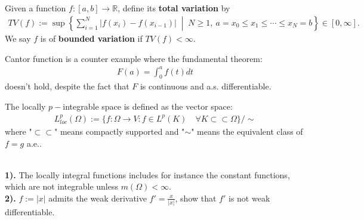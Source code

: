 \begin{definition}
    Given a function $f : [a, b] \to \mathbb{R}$, define its \textbf{total variation} by
    \begin{align*}
        TV(f) := \sup\left\{ \sum_{i=1}^N |f(x_i) - f(x_{i-1})| \;\middle|\; N \geq 1,\ a = x_0 \leq x_1 \leq \cdots \leq x_N = b \right\} \in [0, \infty].
    \end{align*}
    We say $f$ is of \textbf{bounded variation} if $TV(f) < \infty$.
\end{definition}


\begin{example}
Cantor function is a counter example where the fundamental theorem:
\begin{align*}
	F(a) = \int_0^a f(t) dt
\end{align*}	
doesn't hold, despite the fact that $F$ is continuous and a.s. differentiable.
\end{example}

\begin{definition}
	The locally $p-$integrable space is defined as the vector space:
	\begin{align*}
		L^p_{loc}(\Omega):= 
		\bigg\{ f : \Omega \rightarrow V: f \in L^p(K) \quad \forall K \subset \subset \Omega \bigg\} \slash \sim
	\end{align*}
	where "$\subset\subset$" means compactly supported and "$\sim$" means the equivalent class of $f = g$ a.e..
\end{definition}

\begin{example}
\quad\\
\textbf{1).} The locally integral functions includes for instance the constant functions, which are not integrable unless $m(\Omega)< \infty$.\\
\textbf{2).}
	$f:= |x|$ admits the weak derivative $f'= \frac{x}{|x|}$, show that $f'$ is not weak differentiable. 
\end{example}


